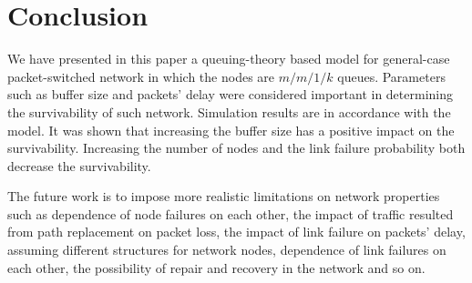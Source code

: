\documentclass[onecolumn,conference]{IEEEtran}
\begin{document}
    \section{Conclusion} \label{sec:conc}
    We have presented in this paper a queuing-theory based model for general-case packet-switched network in which the nodes are $m/m/1/k$ queues. Parameters such as buffer size and packets' delay were considered important in determining the survivability of such network. Simulation results are in accordance with the model. It was shown that increasing the buffer size has a positive impact on the survivability. Increasing the number of nodes and the link failure probability both decrease the survivability.

    The future work is to impose more realistic limitations on network properties such as dependence of node failures on each other, the impact of traffic resulted from path replacement on packet loss, the impact of link failure on packets' delay, assuming different structures for network nodes, dependence of link failures on each other, the possibility of repair and recovery in the network and so on.
   
\end{document}
